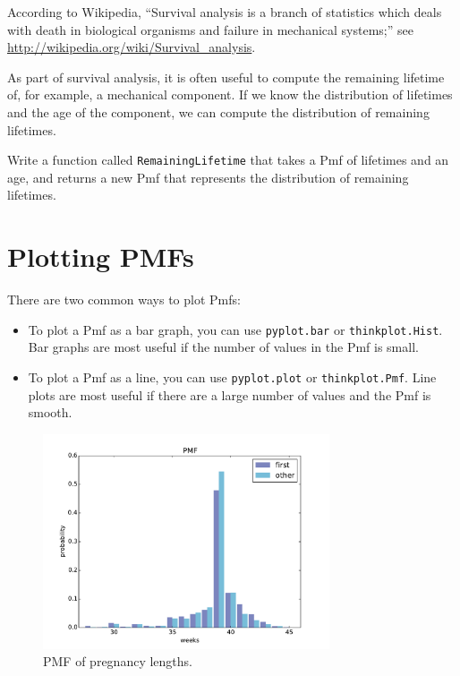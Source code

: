 \documentclass[12pt]{book}
\begin{document}
\begin{exercise}
According to Wikipedia, ``Survival analysis is a branch of statistics
which deals with death in biological organisms and failure in
mechanical systems;'' see \url{http://wikipedia.org/wiki/Survival_analysis}.

As part of survival analysis, it is often useful to compute the
remaining lifetime of, for example, a mechanical component.  If we
know the distribution of lifetimes and the age of the component,
we can compute the distribution of remaining lifetimes.

Write a function called {\tt RemainingLifetime} that takes a
Pmf of lifetimes and an age, and returns a new Pmf that represents
the distribution of remaining lifetimes.

\end{exercise}


\section{Plotting PMFs}

There are two common ways to plot Pmfs:

\begin{itemize}

\item To plot a Pmf as a bar graph, you can use {\tt pyplot.bar}
or {\tt thinkplot.Hist}.  Bar graphs are most useful if the number
of values in the Pmf is small.

\item To plot a Pmf as a line, you can use {\tt pyplot.plot}
or {\tt thinkplot.Pmf}.  Line plots are most useful if there are
a large number of values and the Pmf is smooth.

\end{itemize}

\begin{figure}
\centerline{\includegraphics[height=2.5in]{figs/nsfg_pmf.pdf}}
\caption{PMF of pregnancy lengths.}
\label{nsfg_pmf}
\end{figure}
\end{document}
